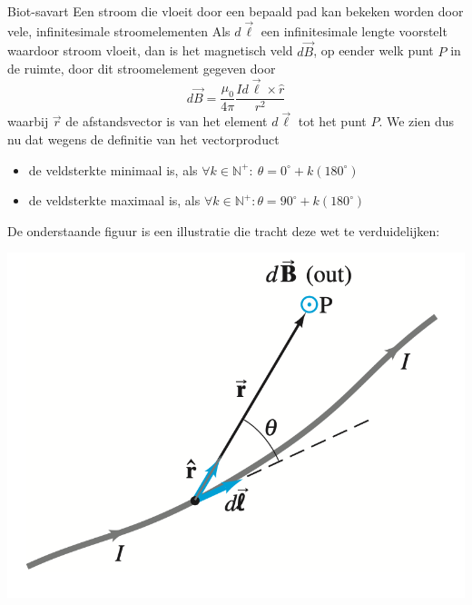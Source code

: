 \begin{lem}{Biot-savart}
    Een stroom die vloeit door een bepaald pad kan bekeken worden door vele, infinitesimale
    stroomelementen
    Als $d\Vec{\ell}$ een infinitesimale lengte voorstelt waardoor stroom
    vloeit, dan is het magnetisch veld $d\Vec{B}$, op eender welk punt $P$ in de ruimte, door
    dit stroomelement gegeven door
    \begin{equation*}
        d\Vec{B} = \dfrac{\mu_{0}}{4\pi}\dfrac{Id\Vec{\ell} \times \hat{r}}{r^2}
    \end{equation*}
    waarbij $\Vec{r}$ de afstandsvector is van het element $d\Vec{\ell}$ tot het punt $P$. 
    We zien dus nu dat wegens de definitie van het vectorproduct
    \begin{itemize}
        \item de veldsterkte minimaal is, als $\forall k \in \mathbb{N}^{+}: \ \theta = 0^{\circ} + k(180^{\circ})$
        \item de veldsterkte maximaal is, als $\forall k \in \mathbb{N}^{+}: \theta = 90^{\circ} + k(180^{\circ})$
    \end{itemize} 
    De onderstaande figuur is een illustratie die tracht deze wet te verduidelijken:
    \begin{center}
        \includegraphics[scale = 0.4]{Images/Magnetisme/BiotSavart.png}

\end{center}
\end{lem}
